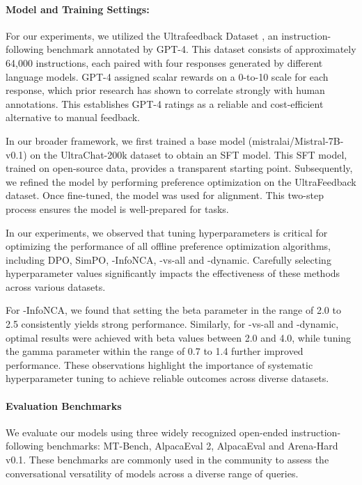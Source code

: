 \paragraph{Model and Training Settings:}
For our experiments, we utilized the Ultrafeedback Dataset \cite{cui2023ultrafeedback}, an instruction-following benchmark annotated by GPT-4. This dataset consists of approximately 64,000 instructions, each paired with four responses generated by different language models. GPT-4 assigned scalar rewards on a 0-to-10 scale for each response, which prior research has shown to correlate strongly with human annotations. This establishes GPT-4 ratings as a reliable and cost-efficient alternative to manual feedback.

In our broader framework, we first trained a base model (mistralai/Mistral-7B-v0.1) on the UltraChat-200k dataset to obtain an SFT model. This SFT model, trained on open-source data, provides a transparent starting point. Subsequently, we refined the model by performing preference optimization on the UltraFeedback dataset. Once fine-tuned, the model was used for alignment. This two-step process ensures the model is well-prepared for tasks.

In our experiments, we observed that tuning hyperparameters is critical for optimizing the performance of all offline preference optimization algorithms, including DPO, SimPO, -InfoNCA, -vs-all and -dynamic. Carefully selecting hyperparameter values significantly impacts the effectiveness of these methods across various datasets.

For -InfoNCA, we found that setting the beta parameter in the range of 2.0 to 2.5 consistently yields strong performance. Similarly, for -vs-all and -dynamic, optimal results were achieved with beta values between 2.0 and 4.0, while tuning the gamma parameter within the range of 0.7 to 1.4 further improved performance. These observations highlight the importance of systematic hyperparameter tuning to achieve reliable outcomes across diverse datasets.

\paragraph{Evaluation Benchmarks}
We evaluate our models using three widely recognized open-ended instruction-following benchmarks: MT-Bench, AlpacaEval 2, AlpacaEval and Arena-Hard v0.1. These benchmarks are commonly used in the community to assess the conversational versatility of models across a diverse range of queries.

